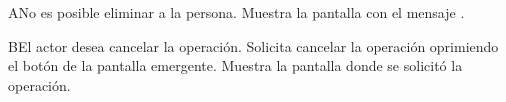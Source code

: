  \begin{UCtrayectoriaA}{A}{No es posible eliminar a la persona.}
    \UCpaso[\UCsist] Muestra la pantalla  con el mensaje .
 \end{UCtrayectoriaA} 
 \begin{UCtrayectoriaA}{B}{El actor desea cancelar la operación.}
    \UCpaso[\UCactor] Solicita cancelar la operación oprimiendo el botón  de la pantalla emergente.
    \UCpaso[\UCsist] Muestra la pantalla donde se solicitó la operación.
 \end{UCtrayectoriaA} 